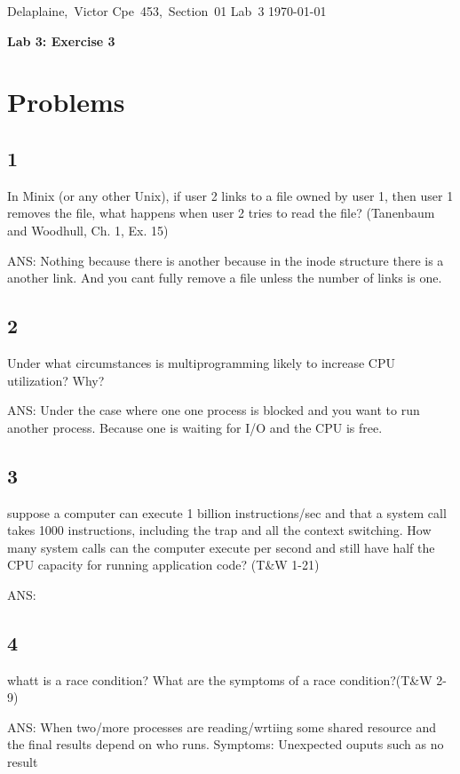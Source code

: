 \documentclass[11pt]{article}
\begin{document}
\hfill\vbox{\hbox{Delaplaine, Victor}
		\hbox{Cpe 453, Section 01}	
		\hbox{Lab 3}	
		\hbox{\today}}\par

\bigskip
\centerline{\Large\bf Lab 3: Exercise 3}\par
\bigskip 


\section{Problems}


\subsection{1}
In Minix (or any other Unix), if user 2 links to a file owned by user 1, then user 1 removes
the file, what happens when user 2 tries to read the file? (Tanenbaum and Woodhull, Ch. 1,
Ex. 15)
 
ANS: Nothing because there is another because in the inode structure there is a another link. And you cant fully remove a file unless the number of links is one.


\subsection{2}
Under what circumstances is multiprogramming likely to increase CPU utilization? Why?

ANS: Under the case where one one process is blocked and you want to run another process.
	Because one is waiting for I/O and the CPU is free.
\subsection{3}
suppose a computer can execute 1 billion instructions/sec and that a system call takes 1000
instructions, including the trap and all the context switching. How many system calls can
the computer execute per second and still have half the CPU capacity for running application
code? (T&W 1-21)

ANS: 

\subsection{4}

whatt is a race condition? What are the symptoms of a race condition?(T&W 2-9)

ANS: When two/more processes are reading/wrtiing some shared resource and the final results depend on who runs.
	Symptoms: Unexpected ouputs such as no result 
\end{document}
